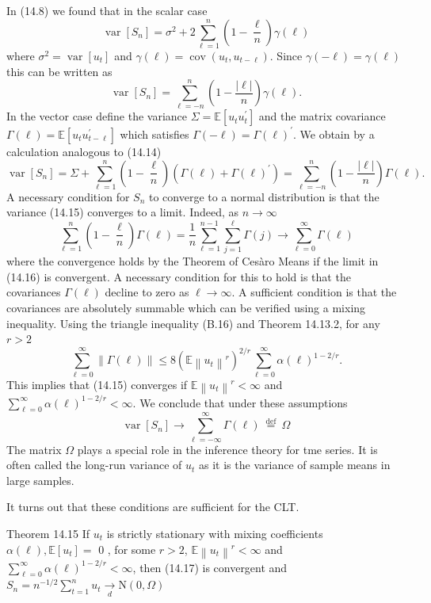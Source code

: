 \documentclass[10pt]{article}
\begin{document}
In (14.8) we found that in the scalar case
$$
\operatorname{var}\left[S_{n}\right]=\sigma^{2}+2 \sum_{\ell=1}^{n}\left(1-\frac{\ell}{n}\right) \gamma(\ell)
$$
where $\sigma^{2}=\operatorname{var}\left[u_{t}\right]$ and $\gamma(\ell)=\operatorname{cov}\left(u_{t}, u_{t-\ell}\right)$. Since $\gamma(-\ell)=\gamma(\ell)$ this can be written as
$$
\operatorname{var}\left[S_{n}\right]=\sum_{\ell=-n}^{n}\left(1-\frac{|\ell|}{n}\right) \gamma(\ell) .
$$
In the vector case define the variance $\Sigma=\mathbb{E}\left[u_{t} u_{t}^{\prime}\right]$ and the matrix covariance $\Gamma(\ell)=\mathbb{E}\left[u_{t} u_{t-\ell}^{\prime}\right]$ which satisfies $\Gamma(-\ell)=\Gamma(\ell)^{\prime}$. We obtain by a calculation analogous to (14.14)
$$
\operatorname{var}\left[S_{n}\right]=\Sigma+\sum_{\ell=1}^{n}\left(1-\frac{\ell}{n}\right)\left(\Gamma(\ell)+\Gamma(\ell)^{\prime}\right)=\sum_{\ell=-n}^{n}\left(1-\frac{|\ell|}{n}\right) \Gamma(\ell) .
$$
A necessary condition for $S_{n}$ to converge to a normal distribution is that the variance (14.15) converges to a limit. Indeed, as $n \rightarrow \infty$
$$
\sum_{\ell=1}^{n}\left(1-\frac{\ell}{n}\right) \Gamma(\ell)=\frac{1}{n} \sum_{\ell=1}^{n-1} \sum_{j=1}^{\ell} \Gamma(j) \rightarrow \sum_{\ell=0}^{\infty} \Gamma(\ell)
$$
where the convergence holds by the Theorem of Cesàro Means if the limit in (14.16) is convergent. A necessary condition for this to hold is that the covariances $\Gamma(\ell)$ decline to zero as $\ell \rightarrow \infty$. A sufficient condition is that the covariances are absolutely summable which can be verified using a mixing inequality. Using the triangle inequality (B.16) and Theorem 14.13.2, for any $r>2$
$$
\sum_{\ell=0}^{\infty}\|\Gamma(\ell)\| \leq 8\left(\mathbb{E}\left\|u_{t}\right\|^{r}\right)^{2 / r} \sum_{\ell=0}^{\infty} \alpha(\ell)^{1-2 / r} .
$$
This implies that (14.15) converges if $\mathbb{E}\left\|u_{t}\right\|^{r}<\infty$ and $\sum_{\ell=0}^{\infty} \alpha(\ell)^{1-2 / r}<\infty$. We conclude that under these assumptions
$$
\operatorname{var}\left[S_{n}\right] \rightarrow \sum_{\ell=-\infty}^{\infty} \Gamma(\ell) \stackrel{\text { def }}{=} \Omega
$$
The matrix $\Omega$ plays a special role in the inference theory for tme series. It is often called the long-run variance of $u_{t}$ as it is the variance of sample means in large samples.

It turns out that these conditions are sufficient for the CLT.

Theorem 14.15 If $u_{t}$ is strictly stationary with mixing coefficients $\alpha(\ell), \mathbb{E}\left[u_{t}\right]=$ 0 , for some $r>2$, $\mathbb{E}\left\|u_{t}\right\|^{r}<\infty$ and $\sum_{\ell=0}^{\infty} \alpha(\ell)^{1-2 / r}<\infty$, then (14.17) is convergent and $S_{n}=n^{-1 / 2} \sum_{t=1}^{n} u_{t} \underset{d}{\longrightarrow} \mathrm{N}(0, \Omega)$
\end{document}
